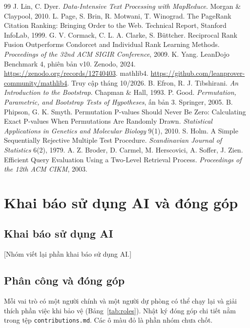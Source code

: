 \documentclass[11pt,a4paper,oneside]{report}
\newcommand{\code}[1]{\texttt{#1}}
\newcommand{\canchot}[1]{\textcolor{red!70!black}{[#1]}}
\begin{document}
\begin{thebibliography}{99}
 J. Lin, C. Dyer. \emph{Data-Intensive Text Processing with MapReduce}. Morgan \& Claypool, 2010.
 L. Page, S. Brin, R. Motwani, T. Winograd. The PageRank Citation Ranking: Bringing Order to the Web.
Technical Report, Stanford InfoLab, 1999.
 G. V. Cormack, C. L. A. Clarke, S. Büttcher. Reciprocal Rank Fusion Outperforms Condorcet and
Individual Rank Learning Methods. \emph{Proceedings of the 32nd ACM SIGIR Conference}, 2009.
 K. Yang. LeanDojo Benchmark 4, phiên bản v10. Zenodo, 2024. \url{https://zenodo.org/records/12740403}.
 mathlib4. \url{https://github.com/leanprover-community/mathlib4}. Truy cập tháng 10/2026.
 B. Efron, R. J. Tibshirani. \emph{An Introduction to the Bootstrap}. Chapman \& Hall, 1993.
 P. Good. \emph{Permutation, Parametric, and Bootstrap Tests of Hypotheses}, ấn bản 3. Springer, 2005.
 B. Phipson, G. K. Smyth. Permutation P-values Should Never Be Zero: Calculating Exact P-values When
Permutations Are Randomly Drawn. \emph{Statistical Applications in Genetics and Molecular Biology} 9(1), 2010.
 S. Holm. A Simple Sequentially Rejective Multiple Test Procedure. \emph{Scandinavian Journal of
Statistics} 6(2), 1979.
 A. Z. Broder, D. Carmel, M. Herscovici, A. Soffer, J. Zien. Efficient Query Evaluation Using a
Two-Level Retrieval Process. \emph{Proceedings of the 12th ACM CIKM}, 2003.
\end{thebibliography}
\endgroup

\appendix
\chapter{Khai báo sử dụng AI và đóng góp}\label{app:aicontrib}

\section{Khai báo sử dụng AI}\label{app:ai}

\canchot{Nhóm viết lại phần khai báo sử dụng AI.}

\section{Phân công và đóng góp}\label{app:contrib}

Mỗi vai trò có một người chính và một người dự phòng có thể chạy lại và giải thích phần việc khi bảo vệ
(Bảng~\ref{tab:roles}). Nhật ký đóng góp chi tiết nằm trong tệp \code{contributions.md}. Các ô màu đỏ là phần nhóm chưa
chốt.
\end{document}
